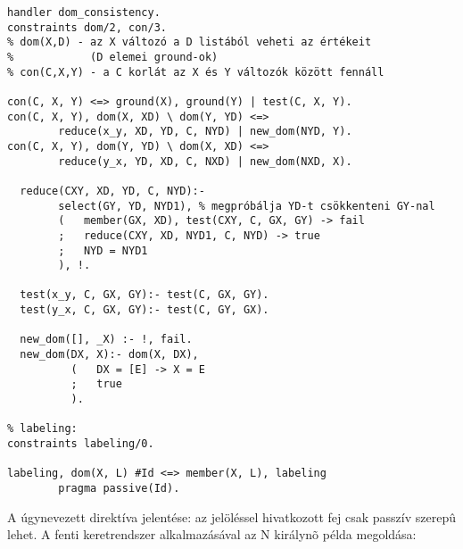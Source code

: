 \begin{verbatim}
handler dom_consistency.
constraints dom/2, con/3.
% dom(X,D) - az X változó a D listából veheti az értékeit
%            (D elemei ground-ok)
% con(C,X,Y) - a C korlát az X és Y változók között fennáll

con(C, X, Y) <=> ground(X), ground(Y) | test(C, X, Y).
con(C, X, Y), dom(X, XD) \ dom(Y, YD) <=> 
        reduce(x_y, XD, YD, C, NYD) | new_dom(NYD, Y).
con(C, X, Y), dom(Y, YD) \ dom(X, XD) <=> 
        reduce(y_x, YD, XD, C, NXD) | new_dom(NXD, X).

  reduce(CXY, XD, YD, C, NYD):- 
        select(GY, YD, NYD1), % megpróbálja YD-t csökkenteni GY-nal
        (   member(GX, XD), test(CXY, C, GX, GY) -> fail
        ;   reduce(CXY, XD, NYD1, C, NYD) -> true
        ;   NYD = NYD1
        ), !.

  test(x_y, C, GX, GY):- test(C, GX, GY).
  test(y_x, C, GX, GY):- test(C, GY, GX).

  new_dom([], _X) :- !, fail.
  new_dom(DX, X):- dom(X, DX),
          (   DX = [E] -> X = E
          ;   true
          ).

% labeling:
constraints labeling/0.

labeling, dom(X, L) #Id <=> member(X, L), labeling
        pragma passive(Id).
\end{verbatim}

A  úgynevezett  direktíva jelentése: az 
jelöléssel hivatkozott fej csak passzív szerepû lehet. A fenti keretrendszer
alkalmazásával az N királynõ példa megoldása:

